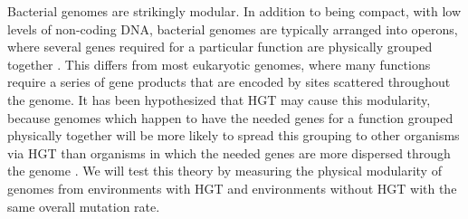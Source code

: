 \begin{mdframed}
Bacterial genomes are strikingly modular. In addition to being compact, with low levels of non-coding DNA, bacterial genomes are typically arranged into operons, where several genes required for a particular function are physically grouped together \cite{Yin2010}. This differs from most eukaryotic genomes, where many functions require a series of gene products that are encoded by sites scattered throughout the genome. It has been hypothesized that HGT may cause this modularity, because genomes which happen to have the needed genes for a function grouped physically together will be more likely to spread this grouping to other organisms via HGT than organisms in which the needed genes are more dispersed through the genome \cite{Deem2013,Munoz2008}. We will test this theory by measuring the physical modularity of genomes from environments with HGT and environments without HGT with the same overall mutation rate.
\end{mdframed}
